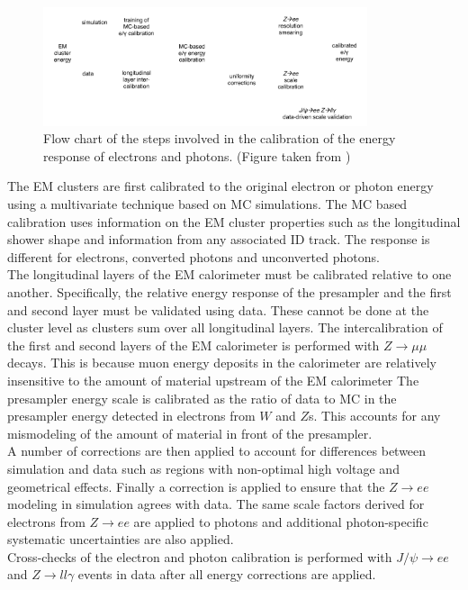 \begin{figure}[htb]
  \begin{center}
    \includegraphics[width=0.85\textwidth]{figures/EMCalib/ElecCalib.png}\hspace{0.05\textwidth}
\end{center}
\caption{Flow chart of the steps involved in the calibration of the energy response of electrons and photons.  (Figure taken from \cite{EMReco8TeV}) }
\label{fig:EMCalibFlow} 
\end{figure}

\indent The EM clusters are first calibrated to the original electron or photon energy using a multivariate technique \cite{TMVA} based on MC simulations.\cite{EMReco13TeV,EMReco8TeV}   The MC based calibration uses information on the EM cluster properties such as the longitudinal shower shape and information from any associated ID track.  The response is different for electrons, converted photons and unconverted photons.  \\

\indent The longitudinal layers of the EM calorimeter must be calibrated relative to one another.  Specifically, the relative energy response of the presampler and the first and second layer must be validated using data.  These cannot be done at the cluster level as clusters sum over all longitudinal layers.  The intercalibration of the first and second layers of the EM calorimeter is performed with $Z\rightarrow\mu\mu$ decays.   This is because muon energy deposits in the calorimeter are relatively insensitive to the amount of material upstream of the EM calorimeter  The presampler energy scale is calibrated as the ratio of data to MC in the presampler energy detected in electrons from $W$ and $Z$s.  This accounts for any mismodeling of the amount of material in front of the presampler. \\

\indent A number of corrections are then applied to account for differences between simulation and data such as regions with non-optimal high voltage and geometrical effects.  Finally a correction is applied to ensure that the $Z\rightarrow ee$ modeling in simulation agrees with data.  The same scale factors derived for electrons from $Z\rightarrow ee$ are applied to photons and additional photon-specific systematic uncertainties are also applied.  \\

\indent Cross-checks of the electron and photon calibration is performed with $J/\psi \rightarrow ee$ and $Z \rightarrow ll\gamma$ events in data after all energy corrections are applied.  